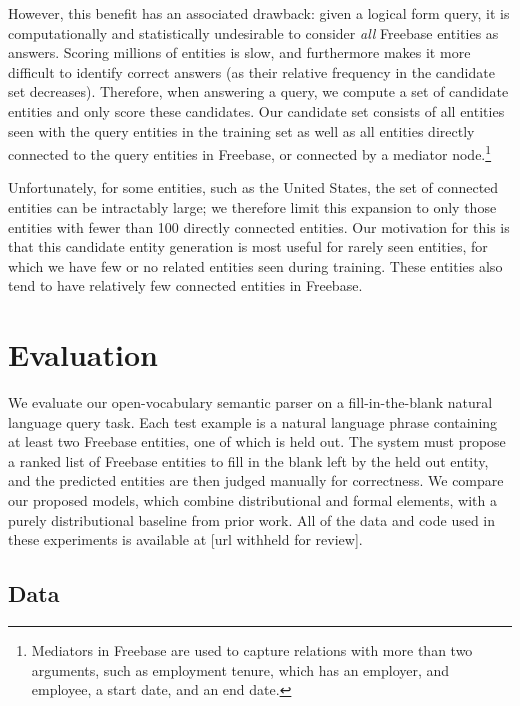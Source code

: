 \documentclass[11pt]{article}
\begin{document}
However, this benefit has an associated drawback: given a logical form
query, it is computationally and statistically undesirable to consider
\emph{all} Freebase entities as answers. Scoring millions of entities
is slow, and furthermore makes it more difficult to identify correct
answers (as their relative frequency in the candidate set decreases).
Therefore, when answering a query, we compute a set of candidate
entities and only score these candidates. Our candidate set consists
of all entities seen with the query entities in the training set as
well as all entities directly connected to the query entities in
Freebase, or connected by a mediator node.\footnote{Mediators in
Freebase are used to capture relations with more than two arguments,
such as employment tenure, which has an employer, and employee, a
start date, and an end date.}

Unfortunately, for some entities, such as the United States, the set
of connected entities can be intractably large; we therefore limit
this expansion to only those entities with fewer than 100 directly
connected entities.  Our motivation for this is that this candidate
entity generation is most useful for rarely seen entities, for which
we have few or no related entities seen during training.  These
entities also tend to have relatively few connected entities in
Freebase.

\section{Evaluation}
\label{sec:evaluation}

We evaluate our open-vocabulary semantic parser on a fill-in-the-blank
natural language query task.  Each test example is a natural language
phrase containing at least two Freebase entities, one of which is held
out.  The system must propose a ranked list of Freebase entities to
fill in the blank left by the held out entity, and the predicted
entities are then judged manually for correctness.  We compare our
proposed models, which combine distributional and formal elements,
with a purely distributional baseline from prior work.  All of the
data and code used in these experiments is available at [url withheld
for review].

\subsection{Data}
\end{document}
